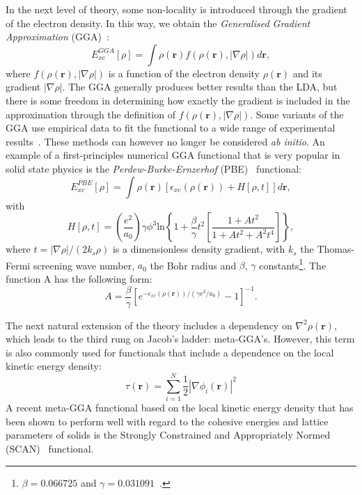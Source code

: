 \begin{refsection}
 \label{dft:sec-GGA}
In the next level of theory, some non-locality is introduced through the 
gradient of the electron density. In this way, we obtain the 
\textit{Generalised Gradient Approximation} (GGA)~\cite{Perdew1992}: 
\begin{equation} 
E_{xc}^{GGA}[\rho] = \int \rho(\mathbf{r}) f(\rho(\mathbf{r}),\left| \nabla 
\rho\right|)d\mathbf{r}, 
\end{equation} 
where $f(\rho(\mathbf{r}),\left| \nabla \rho\right|)$ is a function of the 
electron density $\rho(\mathbf{r})$ and its gradient $\left| \nabla 
\rho\right|$. The GGA generally produces better results than the LDA, but 
there is some freedom in determining how exactly the gradient is included in 
the approximation through the definition of $f(\rho(\mathbf{r}),\left| \nabla 
\rho\right|)$. Some variants of the GGA use empirical data to fit the 
functional to a wide range of experimental results~\cite{Becke1988, Keal2004}. These methods can however 
no longer be considered \textit{ab initio}. An example of a first-principles 
numerical GGA functional that is very popular in solid state physics is the 
\textit{Perdew-Burke-Ernzerhof} (PBE)~\cite{Perdew1996} functional: 
\begin{equation} 
E_{xc}^{PBE}[\rho] = \int \rho(\mathbf{r}) \left[ 
\epsilon_{xc}(\rho(\mathbf{r})) + H[\rho,t] \right] d\mathbf{r}, 
\end{equation} 
with 
\begin{equation} 
H[\rho,t] = \left( \frac{e^2}{a_0} \right) \gamma \phi^3 \text{ln} \left\{ 1 + 
\frac{\beta}{\gamma} t^2 \left[ \frac{1 + A t^2}{1 + A t^2 + A^2 t^4} \right] 
\right\}, 
\end{equation} 
where $t = \left| \nabla \rho \right|/(2 k_s\rho)$ is a dimensionless density 
gradient, with $k_s$ the Thomas-Fermi screening wave number, $a_0$ the Bohr 
radius and $\beta$, $\gamma$ constants\footnote{$\beta = 0.066725$ and $\gamma 
= 0.031091$~\cite{Kohanoff2006}.}. The function A has the following form: 
\begin{equation} 
A = \frac{\beta}{\gamma} \left[ e^{-\epsilon_{xc}(\rho(\mathbf{r}))/(\gamma 
e^2 /a_0)} - 1 \right]^{-1}. 
\end{equation} 

 \label{dft:sec-metaGGA}
The next natural extension of the theory includes a dependency on $\nabla^2 
\rho(\mathbf{r})$, which leads to the third rung on Jacob's ladder: 
meta-GGA's. However, this term is also commonly used for functionals that 
include a dependence on the local kinetic energy density: 
\begin{equation} 
\tau (\mathbf{r}) = \sum_{i=1}^N \frac{1}{2} \left| \nabla \phi_i (\mathbf{r}) 
\right|^2 
\end{equation} 
A recent meta-GGA functional based on the local kinetic energy density that 
has been shown to perform well with regard to the cohesive energies and 
lattice parameters of solids is the Strongly Constrained and Appropriately 
Normed (SCAN)~\cite{Sun2015} functional. 
 

\end{refsection}
